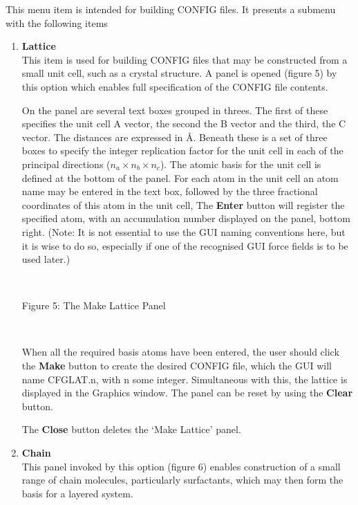 This menu item is intended for building \DD{} CONFIG files. It presents
a submenu with the following items
\begin{enumerate}
\item {\bf Lattice}\\
This item is used for building CONFIG files that may be constructed
from a small unit cell, such as a crystal structure. A panel is opened
(figure 5) by this option which enables full specification of the CONFIG file
contents.

On the panel are several text boxes grouped in threes. The
first of these specifies the unit cell A vector, the second the B
vector and the third, the C vector. The distances are expressed in
\AA. Beneath these is a set of three boxes to specify the integer 
replication factor for the unit cell in each of the principal
directions ($n_a\times n_b\times n_c$).  The atomic basis for the unit
cell is defined at the bottom of the panel. For each atom in the unit
cell an atom name may be entered in the text box, followed by the
three fractional coordinates of this atom in the unit cell, The {\bf
Enter} button will register the specified atom, with an accumulation
number displayed on the panel, bottom right. (Note: It is not
essential to use the GUI naming conventions here, but it is wise to do
so, especially if one of the recognised GUI force fields is to be used
later.)


~

\vskip 5mm
\centerline{}
\centerline{Figure 5: The Make Lattice Panel}
\vskip 5mm

~

\noindent 
When all the required basis atoms have been entered, the user should
click the {\bf Make} button to create the desired CONFIG file, which
the GUI will name CFGLAT.n, with n some integer. Simultaneous with
this, the lattice is displayed in the Graphics window. The panel can
be reset by using the {\bf Clear} button. 

The {\bf Close} button deletes the `Make Lattice' panel.

\item {\bf Chain}\\
This panel invoked by this option (figure 6) enables construction of a
small range of chain molecules, particularly surfactants, which may
then form the basis for a layered system.


\end{enumerate}
